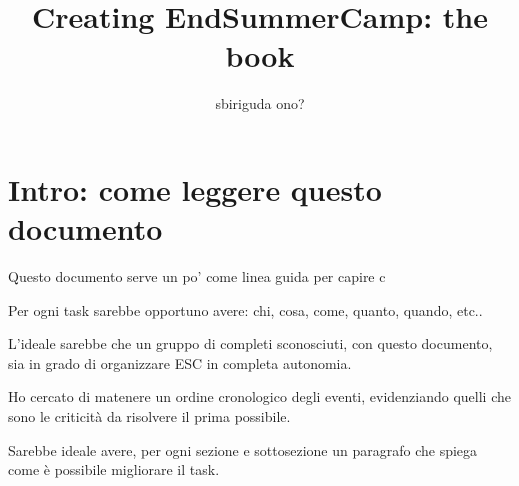 \documentclass[12pt,a4paper,twoside]{book}
\title{Creating EndSummerCamp: the book}
\author{sbiriguda ono? \\
        }
\begin{document}
\maketitle
\tableofcontents

\chapter{Intro: come leggere questo documento}
Questo documento serve un po' come linea guida per capire c

Per ogni task sarebbe opportuno avere: chi, cosa, come, quanto, quando, etc..

L'ideale sarebbe che un gruppo di completi sconosciuti, con questo documento, sia in grado di organizzare ESC in completa autonomia. 

Ho cercato di matenere un ordine cronologico degli eventi, evidenziando quelli che sono le criticit\`a da risolvere il prima possibile.

Sarebbe ideale avere, per ogni sezione e sottosezione un paragrafo che spiega come \`e possibile migliorare il task.















\end{document}

